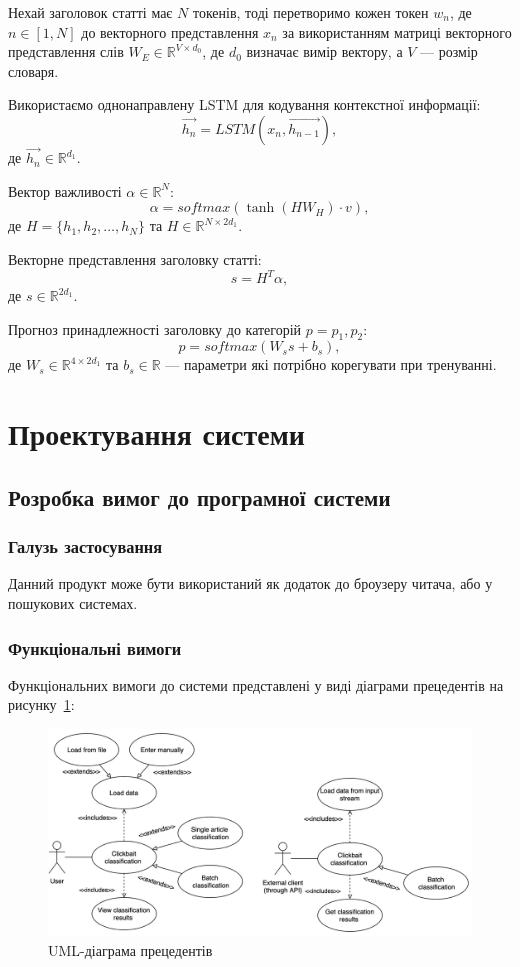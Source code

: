 Нехай заголовок статті має $N$ токенів, тоді перетворимо кожен токен $w_n$, де $n \in [1, N]$ до векторного представлення $x_n$ за використанням матриці векторного представлення слів $W_E \in \mathbb{R}^{V \times d_0}$, де $d_0$ визначає вимір вектору, а $V$ --- розмір словаря. 

Використаємо однонаправлену LSTM для кодування контекстної информації:
\[
    \vec{h_n} = LSTM(x_n, \vec{h_{n-1}}),
\]
де $\vec{h_n} \in \mathbb{R}^{d_1}$.

Вектор важливості $\alpha \in \mathbb{R}^N$:
\[
    \alpha = softmax(\tanh(H W_H) \cdot v),
\]
де $H = \{ h_1, h_2, \dots, h_N \}$ та $H \in \mathbb{R}^{N \times 2d_1}$.

Векторне представлення заголовку статті:
\[
    s = H^T \alpha,
\]
де $s \in \mathbb{R}^{2d_1}$.

Прогноз принадлежності заголовку до категорій $p = { p_1, p_2 }$:
\[
    p = softmax(W_s s + b_s),
\]
де $W_s \in \mathbb{R}^{4\times 2d_1}$ та $b_s \in \mathbb{R}$ --- параметри які потрібно корегувати при тренуванні.

\section{Проектування системи}
\subsection{Розробка вимог до програмної системи}
\subsubsection{Галузь застосування}
Данний продукт може бути використаний як додаток до броузеру читача, або у пошукових системах.

\subsubsection{Функціональні вимоги}
Функціональних вимоги до системи представлені у виді діаграми прецедентів на рисунку~\ref{fig:use_case}:

\begin{figure}[H]
	\centering
	\includegraphics[width=\textwidth]{use_case}
	\caption{UML-діаграма прецедентів}
	\label{fig:use_case}
\end{figure} 

